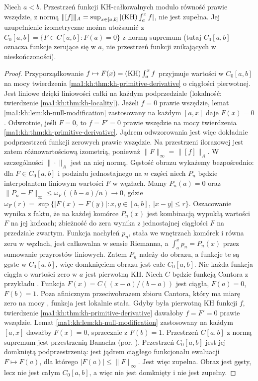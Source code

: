 \begin{stwierdzenie}\label{it:thm:alexiewicz-completion}
Niech $a<b$. Przestrzeń funkcji KH-całkowalnych modulo równość prawie wszędzie, z normą $\|[f]\|_A=\sup_{x\in[a,b]}|(\mathrm{KH})\int_a^x f|$, nie jest zupełna. Jej uzupełnienie izometryczne można utożsamić z $C_0[a,b]=\{F\in C[a,b]:F(a)=0\}$ z normą supremum (tutaj $C_0[a,b]$ oznacza funkcje zerujące się w $a$, nie przestrzeń funkcji znikających w nieskończoności).
\end{stwierdzenie}
\begin{proof}
Przyporządkowanie $f\mapsto F(x)=(\mathrm{KH})\int_a^x f$ przyjmuje wartości w $C_0[a,b]$ na mocy twierdzenia \ref{ma1:kh:thm:kh-primitive-derivative} o ciągłości pierwotnej. Jest liniowe dzięki liniowości całki na każdym
podprzedziale (lokalność: twierdzenie
\ref{ma1:kh:thm:kh-locality}).
Jeżeli $f=0$ prawie wszędzie, lemat
\ref{ma1:kh:lem:kh-null-modification} zastosowany na
każdym $[a,x]$ daje $F(x)=0$. Odwrotnie, jeśli $F=0$,
to $f=F'=0$ prawie wszędzie na mocy twierdzenia
\ref{ma1:kh:thm:kh-primitive-derivative}.
Jądrem odwzorowania jest więc dokładnie podprzestrzeń
funkcji zerowych prawie wszędzie. Na przestrzeni ilorazowej jest zatem różnowartościową izometrią, ponieważ $\|F\|_\infty=\|[f]\|_A$. W szczególności $\|\cdot\|_A$ jest na niej normą. Gęstość obrazu wykażemy bezpośrednio: dla $F\in C_0[a,b]$ i podziału jednostajnego na $n$ części niech $P_n$ będzie interpolantem liniowym wartości $F$ w węzłach. Mamy $P_n(a)=0$ oraz $\|P_n-F\|_\infty\le\omega_F((b-a)/n)\to0$, gdzie $\omega_F(r)=\sup\{|F(x)-F(y)|:x,y\in[a,b],\ |x-y|\le r\}$. Oszacowanie wynika z faktu, że na każdej komórce $P_n(x)$ jest kombinacją wypukłą wartości $F$ na jej końcach; zbieżność do zera wynika z jednostajnej ciągłości $F$ na przedziale zwartym. Funkcja nachyleń $p_n$, stała we wnętrzach komórek i równa zeru w węzłach, jest całkowalna w sensie Riemanna, a $\int_a^x p_n=P_n(x)$ przez sumowanie przyrostów liniowych. Zatem $P_n$ należy do obrazu, a funkcje te są gęste w $C_0[a,b]$, więc domknięciem obrazu jest całe $C_0[a,b]$. Nie każda funkcja ciągła o wartości zero w $a$ jest pierwotną KH. Niech $C$ będzie funkcją Cantora z przykładu
.
Funkcja $F(x)=C((x-a)/(b-a))$ jest ciągła, $F(a)=0$, $F(b)=1$.
Poza afinicznym przeciwobrazem zbioru Cantora, który ma miarę zero
na mocy ,
funkcja jest lokalnie stała. Gdyby była pierwotną KH funkcji $f$,
twierdzenie \ref{ma1:kh:thm:kh-primitive-derivative}
dawałoby $f=F'=0$ prawie wszędzie. Lemat
\ref{ma1:kh:lem:kh-null-modification} zastosowany na każdym $[a,x]$
dawałby $F(x)=0$, sprzecznie z $F(b)=1$.
Przestrzeń $C[a,b]$ z normą supremum jest przestrzenią Banacha
(por. ).
Przestrzeń $C_0[a,b]$ jest jej domkniętą podprzestrzenią:
jest jądrem ciągłego funkcjonału ewaluacji $F\mapsto F(a)$,
dla którego $|F(a)|\le\|F\|_\infty$. Jest więc zupełna. Obraz jest gęsty, lecz nie jest całym $C_0[a,b]$, a więc nie jest domknięty i nie jest zupełny.
\end{proof}

